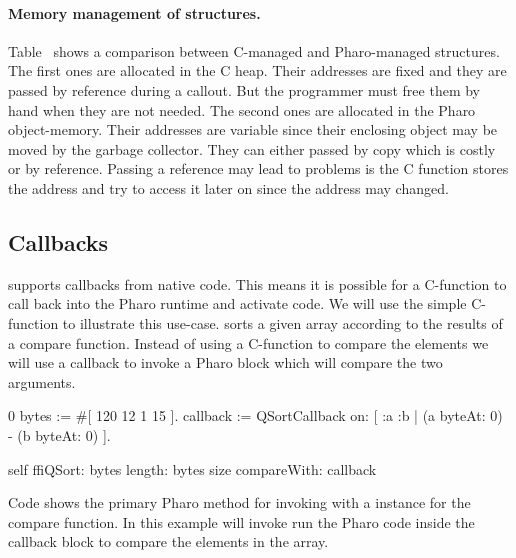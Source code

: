 \paragraph{Memory management of structures.}
Table~ shows a comparison between C-managed and Pharo-managed structures.
The first ones are allocated in the C heap.
Their addresses are fixed and they are passed by reference during a callout.
But the programmer must free them by hand when they are not needed.
The second ones are allocated in the Pharo object-memory.
Their addresses are variable since their enclosing object may be moved by the garbage collector.
They can either passed by copy which is costly or by reference.
Passing a reference may lead to problems is the C function stores the address and try to access it later on since the address may changed.


\subsection{Callbacks}

\NB supports callbacks from native code.
This means it is possible for a C-function to call back into the Pharo runtime and activate code.
We will use the simple  C-function to illustrate this use-case.
 sorts a given array according to the results of a compare function.
Instead of using a C-function to compare the elements we will use a callback to invoke a Pharo block which will compare the two arguments.
%
\begin{stcode}[
	label={lst:calloutWithCallback},
	caption={Example of callout passing a callback for \ttt{qsort}}]{0}
bytes := #[ 120 12 1 15 ].
callback := QSortCallback on: [ :a :b |
				(a byteAt: 0) - (b byteAt: 0) ].

self ffiQSort: bytes
	 length: bytes size
	 compareWith: callback
\end{stcode}
%
Code  shows the primary Pharo method for invoking  with a  instance for the compare function.
In this example  will invoke run the Pharo code inside the callback block to compare the elements in the  array.

